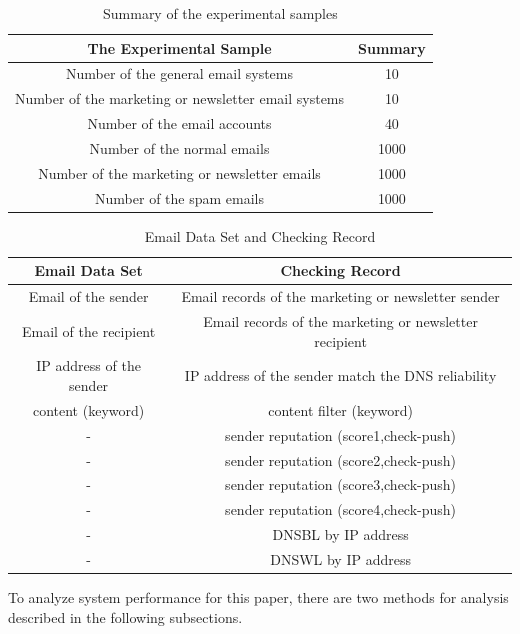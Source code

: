 \documentclass[conference]{IEEEtran}
\begin{document}
\begin{table}[!t]
\renewcommand{\arraystretch}{1.2}
\caption{Summary of the experimental samples}
\label{table_inputData}
\centering
\begin{tabular}{c|c}
\hline
\bfseries The Experimental Sample & \bfseries Summary\\
\hline
Number of the general email systems & 10\\
\hline
Number of the marketing or newsletter email systems & 10\\
\hline
Number of the email accounts & 40\\
\hline
Number of the normal emails & 1000\\
\hline
Number of the marketing or newsletter emails& 1000\\
\hline
Number of the spam emails& 1000\\
\hline
\end{tabular}
\end{table}

\begin{table}[!t]
\renewcommand{\arraystretch}{1.2}
\caption{Email Data Set and Checking Record}
\label{table_emailDataset_checkRecord}
\centering
\begin{tabular}{c|c}
\hline
\bfseries Email Data Set & \bfseries Checking Record\\
\hline
Email of the sender & Email records of the marketing or newsletter sender\\
\hline
Email of the recipient & Email records of the marketing or newsletter recipient\\
\hline
IP address of the sender & IP address of the sender match the DNS reliability\\
\hline
content (keyword) & content filter (keyword)\\ 
\hline
- & sender reputation (score1,check-push) \\
\hline
- & sender reputation (score2,check-push) \\
\hline
- & sender reputation (score3,check-push) \\
\hline
- & sender reputation (score4,check-push) \\
\hline
- & DNSBL by IP address \\
\hline
- & DNSWL by IP address\\
\hline
\end{tabular}
\end{table}

To analyze system performance for this paper, there are two methods for analysis described in the following subsections.
\end{document}
